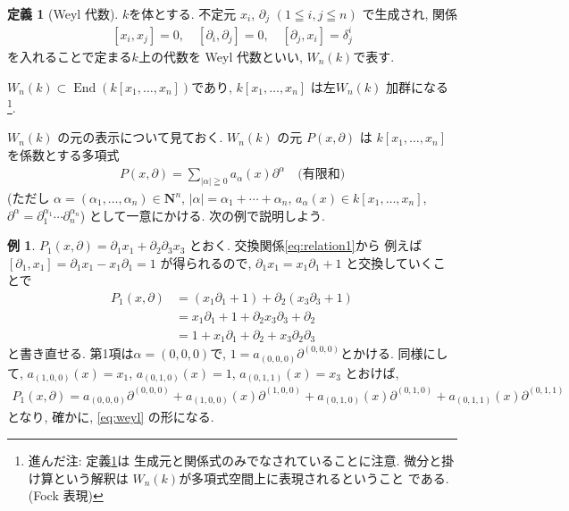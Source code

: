\documentclass[11pt, a4paper, dvipdfmx]{jsarticle}
\theoremstyle{definition}
\newtheorem{Definition}[Axiom]{定義}
\newtheorem{Example}[Axiom]{例}
\newcommand{\nn}{\mathbf{N}}
\newcommand{\p}{\partial}
\newcommand{\End}{\mathop{\mathrm{End}}\nolimits}
\newcommand{\dl}{\delta} %
\numberwithin{equation}{section}
\begin{document}
\begin{Definition}[Weyl 代数]\label{def:weyl}
    $k$を体とする. 不定元 $x_i$, $\p_j$ 
    $(1\leqq i,j\leqq n)$ で生成され, 関係
    \begin{align}\label{eq:relation1}
        [x_i,x_j] = 0, \quad
        [\p_i,\p_j] = 0, \quad
        [\p_j,x_i] = \dl_j^i　
    \end{align}
    を入れることで定まる$k$上の代数を Weyl 代数といい, 
    $W_n(k)$で表す. 
\end{Definition}

$W_n(k)\subset \End(k[x_1,\ldots,x_n])$であり, 
$k[x_1,\ldots,x_n]$ は左$W_n(k)$ 加群になる
\footnote{
    進んだ注: 定義\ref{def:weyl}は
    生成元と関係式のみでなされていることに注意. 
    微分と掛け算という解釈は
    $W_n(k)$が多項式空間上に表現されるということ
    である. (Fock 表現)
}. 

$W_n(k)$ の元の表示について見ておく. 
$W_n(k)$ の元 $P(x,\p)$ は
$k[x_1,\ldots,x_n]$を係数とする多項式
\begin{align}\label{eq:weyl}
    P(x,\p) 
    = \sum_{|\alpha|\geqq 0}a_\alpha(x)\p^\alpha
    \quad \text{(有限和)}
\end{align}
(ただし
$\alpha = (\alpha_1,\ldots ,\alpha_n)\in \nn^n$, 
$|\alpha|=\alpha_1+\cdots+ \alpha_n$,
$a_\alpha(x)\in k[x_1,\ldots,x_n]$,
$\p^\alpha = \p_1^{\alpha_1}\cdots\p_n^{\alpha_n}$)
として一意にかける. 次の例で説明しよう. 

\begin{Example}
    $P_1(x,\p) 
    = \p_1x_1 + \p_2\p_3x_3$
    とおく. 交換関係\eqref{eq:relation1}から
    例えば
    $[\p_1, x_1] = \p_1x_1 - x_1\p_1 = 1$
    が得られるので, 
    $\p_1x_1 = x_1\p_1 + 1$
    と交換していくことで
    \begin{align*}
        P_1(x,\p) 
        &= (x_1\p_1 + 1) + \p_2(x_3\p_3 + 1) \\
        &= x_1\p_1 + 1 + \p_2x_3\p_3 + \p_2 \\
        &= 1 + x_1\p_1 + \p_2 + x_3\p_2\p_3
    \end{align*}
    と書き直せる. 
    第1項は$\alpha = (0,0,0)$で, 
    $1 = a_{(0,0,0)}\p^{(0,0,0)}$とかける. 同様にして, 
    $a_{(1,0,0)}(x)= x_1$, 
    $a_{(0,1,0)}(x)= 1$, 
    $a_{(0,1,1)}(x)= x_3$ 
    とおけば, 
    \begin{align*}
        P_1(x,\p) = a_{(0,0,0)}\p^{(0,0,0)}
        + a_{(1,0,0)}(x)\p^{(1,0,0)} 
        + a_{(0,1,0)}(x)\p^{(0,1,0)}
        + a_{(0,1,1)}(x)\p^{(0,1,1)}
    \end{align*}
    となり, 確かに, \eqref{eq:weyl} の形になる. 
\end{Example}
\end{document}

